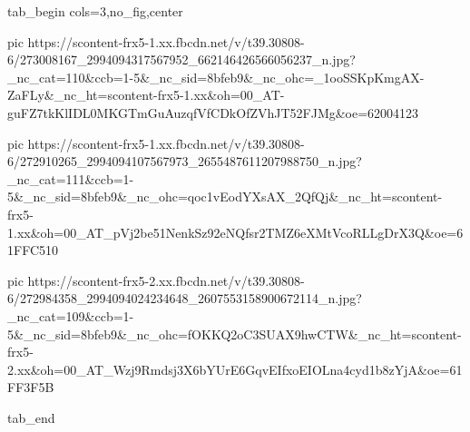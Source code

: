  
 
 
 
 


\ifcmt
  tab_begin cols=3,no_fig,center

     pic https://scontent-frx5-1.xx.fbcdn.net/v/t39.30808-6/273008167_2994094317567952_662146426566056237_n.jpg?_nc_cat=110&ccb=1-5&_nc_sid=8bfeb9&_nc_ohc=_1ooSSKpKmgAX-ZaFLy&_nc_ht=scontent-frx5-1.xx&oh=00_AT-guFZ7tkKlIDL0MKGTmGuAuzqfVfCDkOfZVhJT52FJMg&oe=62004123

     pic https://scontent-frx5-1.xx.fbcdn.net/v/t39.30808-6/272910265_2994094107567973_2655487611207988750_n.jpg?_nc_cat=111&ccb=1-5&_nc_sid=8bfeb9&_nc_ohc=qoc1vEodYXsAX_2QfQj&_nc_ht=scontent-frx5-1.xx&oh=00_AT_pVj2be51NenkSz92eNQfsr2TMZ6eXMtVcoRLLgDrX3Q&oe=61FFC510

     pic https://scontent-frx5-2.xx.fbcdn.net/v/t39.30808-6/272984358_2994094024234648_2607553158900672114_n.jpg?_nc_cat=109&ccb=1-5&_nc_sid=8bfeb9&_nc_ohc=fOKKQ2oC3SUAX9hwCTW&_nc_ht=scontent-frx5-2.xx&oh=00_AT_Wzj9Rmdsj3X6bYUrE6GqvEIfxoEIOLna4cyd1b8zYjA&oe=61FF3F5B

  tab_end
\fi
